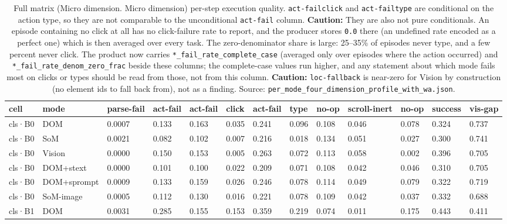 \begin{table}[tp]
\centering
\caption{Full matrix (Micro dimension. Micro dimension) per-step execution quality. \texttt{act-fail\textbar{}click} and \texttt{act-fail\textbar{}type} are conditional on the action type, so they are not comparable to the unconditional \texttt{act-fail} column. \textbf{Caution:} They are also not pure conditionals. An episode containing no click at all has no click-failure rate to report, and the producer stores \texttt{0.0} there (an undefined rate encoded as a perfect one) which is then averaged over every task. The zero-denominator share is large: 25--35\% of episodes never type, and a few percent never click. The product now carries \texttt{*\_fail\_rate\_complete\_case} (averaged only over episodes where the action occurred) and \texttt{*\_fail\_rate\_denom\_zero\_frac} beside these columns; the complete-case values run higher, and any statement about which mode fails most on clicks or types should be read from those, not from this column. \textbf{Caution:} \texttt{loc-fallback} is near-zero for Vision by construction (no element ids to fall back from), not as a finding. Source: \texttt{per\_mode\_four\_dimension\_profile\_with\_wa.json}.}
\label{tab:t08}
\scriptsize
\setlength{\tabcolsep}{3pt}
\begin{tabular}{@{}lllllllllllll@{}}
\toprule
cell & mode & parse-fail & act-fail & act-fail & click & act-fail & type & no-op & scroll-inert & no-op & success & vis-gap \\
\midrule
cls·B0 & DOM & 0.0007 & 0.133 & 0.163 & 0.035 & 0.241 & 0.096 & 0.108 & 0.046 & 0.078 & 0.324 & 0.737 \\
cls·B0 & SoM & 0.0021 & 0.082 & 0.102 & 0.007 & 0.216 & 0.018 & 0.134 & 0.051 & 0.027 & 0.300 & 0.741 \\
cls·B0 & Vision & 0.0000 & 0.150 & 0.153 & 0.005 & 0.263 & 0.072 & 0.113 & 0.058 & 0.002 & 0.396 & 0.705 \\
cls·B0 & DOM+stext & 0.0000 & 0.101 & 0.100 & 0.022 & 0.209 & 0.071 & 0.108 & 0.042 & 0.046 & 0.310 & 0.705 \\
cls·B0 & DOM+sprompt & 0.0009 & 0.133 & 0.159 & 0.026 & 0.246 & 0.078 & 0.114 & 0.049 & 0.079 & 0.322 & 0.719 \\
cls·B0 & SoM-image & 0.0005 & 0.112 & 0.130 & 0.016 & 0.221 & 0.078 & 0.109 & 0.042 & 0.037 & 0.332 & 0.688 \\
cls·B1 & DOM & 0.0031 & 0.285 & 0.155 & 0.153 & 0.359 & 0.219 & 0.074 & 0.011 & 0.175 & 0.443 & 0.411 \\

\end{tabular}
\end{table}
